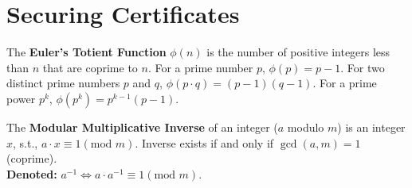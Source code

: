 \newpage
\section{Securing Certificates}


\begin{Def}

    \label{def:euler}
    The \textbf{Euler's Totient Function} $\phi(n)$ is the number of positive integers less than $n$ that are coprime to $n$.
    For a prime number $p$, $\phi(p)=p-1$.
    For two distinct prime numbers $p$ and $q$, $\phi(p \cdot q)=(p-1)(q-1)$.
    For a prime power $p^k$, $\phi(p^k)=p^{k-1}(p-1)$.
\end{Def}

\begin{theo}

    \label{def:mod_inv}
    The \textbf{Modular Multiplicative Inverse} of an integer ($a$ modulo $m$) is an integer $x$, s.t., $a \cdot x \equiv 1 (\text{mod } m)$.
    Inverse exists if and only if $\gcd(a,m)=1$ (coprime).\\

    \noindent
    \textbf{Denoted:} $a^{-1}\iff a \cdot a^{-1} \equiv 1 (\text{mod } m)$.
\end{theo}

